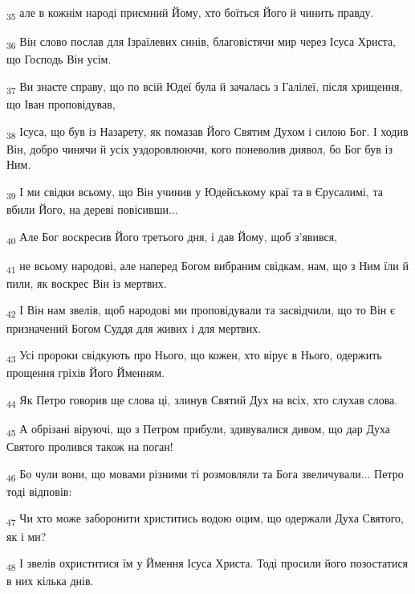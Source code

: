\begin{tcolorbox}
\textsubscript{35} але в кожнім народі приємний Йому, хто боїться Його й чинить правду.
\end{tcolorbox}
\begin{tcolorbox}
\textsubscript{36} Він слово послав для Ізраїлевих синів, благовістячи мир через Ісуса Христа, що Господь Він усім.
\end{tcolorbox}
\begin{tcolorbox}
\textsubscript{37} Ви знаєте справу, що по всій Юдеї була й зачалась з Галілеї, після хрищення, що Іван проповідував,
\end{tcolorbox}
\begin{tcolorbox}
\textsubscript{38} Ісуса, що був із Назарету, як помазав Його Святим Духом і силою Бог. І ходив Він, добро чинячи й усіх уздоровлюючи, кого поневолив диявол, бо Бог був із Ним.
\end{tcolorbox}
\begin{tcolorbox}
\textsubscript{39} І ми свідки всьому, що Він учинив у Юдейському краї та в Єрусалимі, та вбили Його, на дереві повісивши...
\end{tcolorbox}
\begin{tcolorbox}
\textsubscript{40} Але Бог воскресив Його третього дня, і дав Йому, щоб з'явився,
\end{tcolorbox}
\begin{tcolorbox}
\textsubscript{41} не всьому народові, але наперед Богом вибраним свідкам, нам, що з Ним їли й пили, як воскрес Він із мертвих.
\end{tcolorbox}
\begin{tcolorbox}
\textsubscript{42} І Він нам звелів, щоб народові ми проповідували та засвідчили, що то Він є призначений Богом Суддя для живих і для мертвих.
\end{tcolorbox}
\begin{tcolorbox}
\textsubscript{43} Усі пророки свідкують про Нього, що кожен, хто вірує в Нього, одержить прощення гріхів Його Йменням.
\end{tcolorbox}
\begin{tcolorbox}
\textsubscript{44} Як Петро говорив ще слова ці, злинув Святий Дух на всіх, хто слухав слова.
\end{tcolorbox}
\begin{tcolorbox}
\textsubscript{45} А обрізані віруючі, що з Петром прибули, здивувалися дивом, що дар Духа Святого пролився також на поган!
\end{tcolorbox}
\begin{tcolorbox}
\textsubscript{46} Бо чули вони, що мовами різними ті розмовляли та Бога звеличували... Петро тоді відповів:
\end{tcolorbox}
\begin{tcolorbox}
\textsubscript{47} Чи хто може заборонити христитись водою оцим, що одержали Духа Святого, як і ми?
\end{tcolorbox}
\begin{tcolorbox}
\textsubscript{48} І звелів охриститися їм у Ймення Ісуса Христа. Тоді просили його позостатися в них кілька днів.
\end{tcolorbox}
